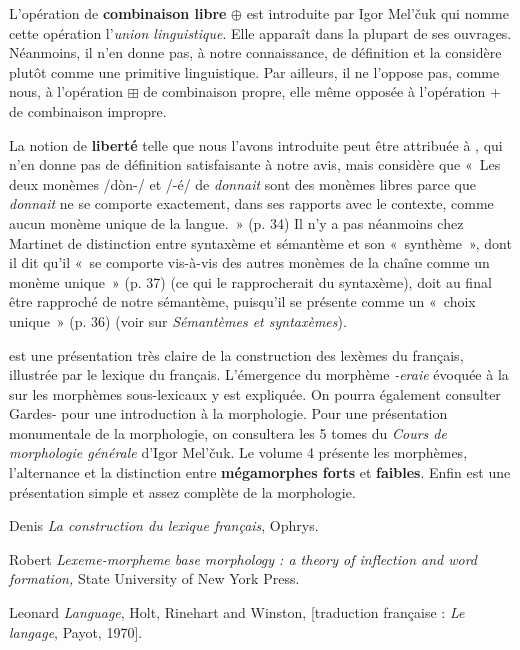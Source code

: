 {    L’opération de \textbf{combinaison libre} \textrm{${\oplus}$} est introduite par Igor Mel’čuk qui nomme cette opération l’\textit{union linguistique}. Elle apparaît dans la plupart de ses ouvrages. Néanmoins, il n’en donne pas, à notre connaissance, de définition et la considère plutôt comme une primitive linguistique. Par ailleurs, il ne l’oppose pas, comme nous, à l’opération \textrm{${\boxplus}$} de combinaison propre, elle même opposée à l’opération + de combinaison impropre.

    La notion de \textbf{liberté} telle que nous l’avons introduite peut être attribuée à \citet{Martinet1985}, qui n’en donne pas de définition satisfaisante à notre avis, mais considère que «~Les deux monèmes /dòn-/ et /-é/ de \textit{donnait} sont des monèmes libres parce que \textit{donnait} ne se comporte exactement, dans ses rapports avec le contexte, comme aucun monème unique de la langue.~» (p. 34) Il n’y a pas néanmoins chez Martinet de distinction entre syntaxème et sémantème et son «~synthème~», dont il dit qu’il «~se comporte vis-à-vis des autres monèmes de la chaîne comme un monème unique~» (p. 37) (ce qui le rapprocherait du syntaxème), doit au final être rapproché de notre sémantème, puisqu’il se présente comme un «~choix unique~» (p. 36) (voir  sur \textit{Sémantèmes et syntaxèmes}).

    \citet{Apothéloz2002} est une présentation très claire de la construction des lexèmes du français, illustrée par le lexique du français. L’émergence du morphème \textit{{}-eraie} évoquée à la  sur les morphèmes sous-lexicaux y est expliquée. On pourra également consulter Gardes-\citet{Tamine1990} pour une introduction à la morphologie. Pour une présentation monumentale de la morphologie, on consultera les 5 tomes du \textit{Cours de morphologie générale} d’Igor Mel’čuk. Le volume 4 présente les morphèmes, l’alternance et la distinction entre \textbf{mégamorphes forts} et \textbf{faibles}. Enfin \citet{HaspelmathSims2013} est une présentation simple et assez complète de la morphologie.

    Denis \citet{Apothéloz2002} \textit{La construction du lexique français}, Ophrys.

    Robert \citet{Beard1995} \textit{Lexeme-morpheme base morphology : a theory of inflection and word formation,} State University of New York Press.

    Leonard \citet{Bloomfield1933} \textit{Language}, Holt, Rinehart and Winston, [traduction française : \textit{Le langage}, Payot, 1970].

}
